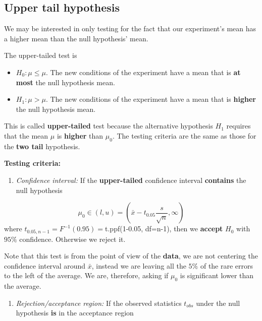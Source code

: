\documentclass[
]{book}
\providecommand{\tightlist}{%
  \setlength{\itemsep}{0pt}\setlength{\parskip}{0pt}}
\begin{document}
\hypertarget{upper-tail-hypothesis}{%
\subsection{Upper tail hypothesis}\label{upper-tail-hypothesis}}

We may be interested in only testing for the fact that our experiment's mean has a higher mean than the null hypothesis' mean.

The upper-tailed test is

\begin{itemize}
\tightlist
\item
  \(H_0:\mu \leq \mu\). The new conditions of the experiment have a mean that is \textbf{at most} the null hypothesis mean.
\item
  \(H_1:\mu > \mu\). The new conditions of the experiment have a mean that is \textbf{higher} the null hypothesis mean.
\end{itemize}

This is called \textbf{upper-tailed} test because the alternative hypothesis \(H_1\) requires that the mean \(\mu\) is \textbf{higher} than \(\mu_0\). The testing criteria are the same as those for the \textbf{two tail} hypothesis.

\textbf{Testing criteria:}

\begin{enumerate}
\def\labelenumi{\arabic{enumi}.}
\tightlist
\item
  \emph{Confidence interval:} If the \textbf{upper-tailed} confidence interval \textbf{contains} the null hypothesis
\end{enumerate}

\[\mu_0\in (l,u)=(\bar{x}-t_{0.05} \frac{s}{\sqrt{n}}, \infty)\]
where \(t_{0.05, n-1}=F^{-1}(0.95)=\)t.ppf(1-0.05, df=n-1), then we \textbf{accept} \(H_0\) with \(95\%\) confidence. Otherwise we reject it.

Note that this test is from the point of view of the \textbf{data}, we are not centering the confidence interval around \(\bar{x}\), instead we are leaving all the \(5\%\) of the rare errors to the left of the average. We are, therefore, asking if \(\mu_0\) is significant lower than the average.

\begin{enumerate}
\def\labelenumi{\arabic{enumi}.}
\setcounter{enumi}{1}
\tightlist
\item
  \emph{Rejection/acceptance region:} If the observed statistics \(t_{obs}\) under the null hypothesis \textbf{is} in the acceptance region
\end{enumerate}
\end{document}
